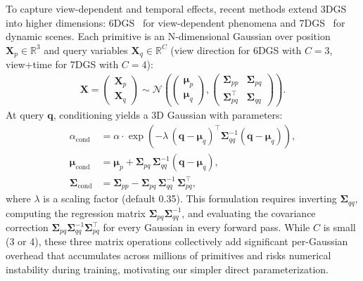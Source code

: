 \documentclass{article}
\theoremstyle{plain}
\theoremstyle{definition}
\theoremstyle{remark}
\begin{document}
To capture view-dependent and temporal effects, recent methods extend 3DGS into higher dimensions: 6DGS~\cite{gao20246dgs} for view-dependent phenomena and 7DGS~\cite{gao20257dgs} for dynamic scenes. Each primitive is an N-dimensional Gaussian over position $\mathbf{X}_p \in \mathbb{R}^3$ and query variables $\mathbf{X}_q \in \mathbb{R}^C$ (view direction for 6DGS with $C=3$, view+time for 7DGS with $C=4$):
\begin{align}
\mathbf{X} = \begin{pmatrix} \mathbf{X}_p \\ \mathbf{X}_q \end{pmatrix} \sim \mathcal{N}\!\left(
\begin{pmatrix}
\boldsymbol{\mu}_p \\ \boldsymbol{\mu}_q
\end{pmatrix},
\begin{pmatrix}
\boldsymbol{\Sigma}_{pp} & \boldsymbol{\Sigma}_{pq} \\
\boldsymbol{\Sigma}_{pq}^\top & \boldsymbol{\Sigma}_{qq}
\end{pmatrix}
\right).
\end{align}
At query $\mathbf{q}$, conditioning yields a 3D Gaussian with parameters:
\begin{align}
\alpha_{\text{cond}} &= \alpha \cdot \exp\left(-\lambda\,(\mathbf{q}-\boldsymbol{\mu}_q)^\top \boldsymbol{\Sigma}_{qq}^{-1}(\mathbf{q}-\boldsymbol{\mu}_q)\right),\\
\boldsymbol{\mu}_{\text{cond}} &= \boldsymbol{\mu}_p + \boldsymbol{\Sigma}_{pq}\,\boldsymbol{\Sigma}_{qq}^{-1}(\mathbf{q}-\boldsymbol{\mu}_q), \\
\boldsymbol{\Sigma}_{\text{cond}} &= \boldsymbol{\Sigma}_{pp} - \boldsymbol{\Sigma}_{pq}\,\boldsymbol{\Sigma}_{qq}^{-1}\,\boldsymbol{\Sigma}_{pq}^\top,
\end{align}
where $\lambda$ is a scaling factor (default 0.35). This formulation requires inverting $\boldsymbol{\Sigma}_{qq}$, computing the regression matrix $\boldsymbol{\Sigma}_{pq}\boldsymbol{\Sigma}_{qq}^{-1}$, and evaluating the covariance correction $\boldsymbol{\Sigma}_{pq}\boldsymbol{\Sigma}_{qq}^{-1}\boldsymbol{\Sigma}_{pq}^\top$ for every Gaussian in every forward pass. While $C$ is small (3 or 4), these three matrix operations collectively add significant per-Gaussian overhead that accumulates across millions of primitives and risks numerical instability during training, motivating our simpler direct parameterization.
\end{document}
